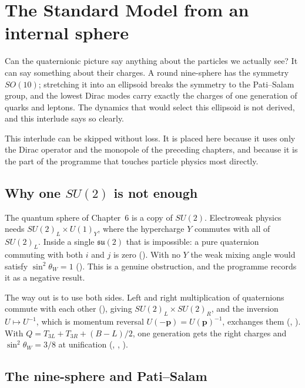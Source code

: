 \chapter{The Standard Model from an internal sphere}\label{int:A}

\begin{questionbox}
Can the quaternionic picture say anything about the particles we actually see? It can say something about their charges. A round nine-sphere has the symmetry $SO(10)$; stretching it into an ellipsoid breaks the symmetry to the Pati--Salam group, and the lowest Dirac modes carry exactly the charges of one generation of quarks and leptons. The dynamics that would select this ellipsoid is not derived, and this interlude says so clearly.
\end{questionbox}

This interlude can be skipped without loss. It is placed here because it uses only the Dirac operator and the monopole of the preceding chapters, and because it is the part of the programme that touches particle physics most directly.

\section{Why one $SU(2)$ is not enough}

The quantum sphere of Chapter~6 is a copy of $SU(2)$. Electroweak physics needs $SU(2)_L\times U(1)_Y$, where the hypercharge $Y$ commutes with all of $SU(2)_L$. Inside a single $\mathfrak{su}(2)$ that is impossible: a pure quaternion commuting with both $i$ and $j$ is zero (). With no $Y$ the weak mixing angle would satisfy $\sin^2\theta_W=1$ (). This is a genuine obstruction, and the programme records it as a negative result. \negative

The way out is to use both sides. Left and right multiplication of quaternions commute with each other (), giving $SU(2)_L\times SU(2)_R$, and the inversion $U\mapsto U^{-1}$, which is momentum reversal $U(-\mathbf p)=U(\mathbf p)^{-1}$, exchanges them (, ). With $Q=T_{3L}+T_{3R}+(B-L)/2$, one generation gets the right charges and $\sin^2\theta_W=3/8$ at unification (, , ).

\section{The nine-sphere and Pati--Salam}


